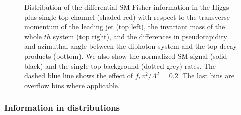 \begin{figure}
  \caption{Distribution of the differential SM Fisher information in
    the Higgs plus single top channel (shaded red) with respect to the
    transverse momentum of the leading jet (top left), the invariant
    mass of the whole $th$ system (top right), and the differences in
    pseudorapidity and azimuthal angle between the diphoton system and
    the top decay products (bottom). We also show the normalized SM
    signal (solid black) and the single-top background (dotted grey)
    rates. The dashed blue line shows the effect of
    $f_{t} \, v^2 / \Lambda^2 = 0.2$. The last bins are overflow bins
    where applicable.}
  \label{fig:information_th_differential_information_jets}
\end{figure}




\subsubsection*{Information in distributions}


